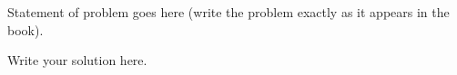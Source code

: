 \begin{problem}{2} 
    Statement of problem goes here (write the problem exactly as it appears in the book).
\end{problem}



\begin{sol}
    Write your solution here.
\end{sol}